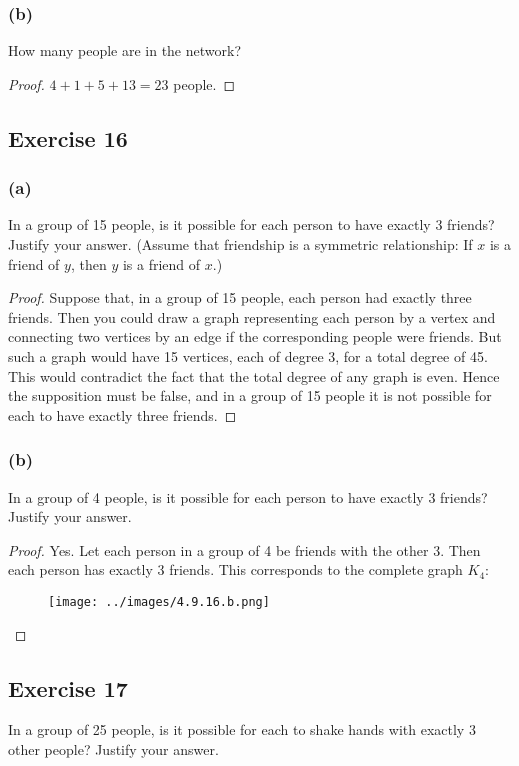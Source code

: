 \documentclass[14pt]{extarticle}
\begin{document}
\subsubsection{(b)}
How many people are in the network?

\begin{proof}
    $4 + 1 + 5 + 13 = 23$ people.
\end{proof}

\subsection{Exercise 16}
\subsubsection{(a)}
In a group of 15 people, is it possible for each person to have exactly 3 friends? Justify your answer. (Assume that friendship is a symmetric relationship: If $x$ is a friend of $y$, then $y$ is a friend of $x$.)

\begin{proof}
    Suppose that, in a group of 15 people, each person had exactly three friends. Then you could draw a graph representing each person by a vertex and connecting two vertices by an edge if the corresponding people were friends. But such a graph would have 15 vertices, each of degree 3, for a total degree of 45. This would contradict the fact that the total degree of any graph is even. Hence the supposition must be false, and in a group of 15 people it is not possible for each to have exactly three friends.
\end{proof}

\subsubsection{(b)}
In a group of 4 people, is it possible for each person to have exactly 3 friends? Justify your answer.

\begin{proof}
    Yes. Let each person in a group of 4 be friends with the other 3. Then each person has exactly 3 friends. This corresponds to the complete graph $K_{4}$:
    \begin{figure}[ht!]
        \centering
        \texttt{[image: ../images/4.9.16.b.png]}
    \end{figure}
\end{proof}

\subsection{Exercise 17}
In a group of 25 people, is it possible for each to shake hands with exactly 3 other people? Justify your answer.
\end{document}
